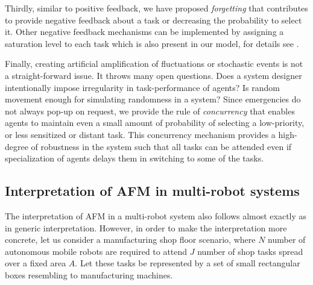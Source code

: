 \documentclass[final,5p,times,twocolumn]{elsarticle}
\begin{document}
Thirdly, similar to positive feedback, we have proposed {\em forgetting} that contributes to provide negative feedback about a task or decreasing the probability to select it. Other negative feedback mechanisms can be implemented by assigning a saturation level to each task which is also present in our model, for details see \citet{Arcaute+2008}.

Finally, creating  artificial amplification of fluctuations or stochastic events is not a straight-forward issue. It throws  many open questions. Does a system designer intentionally impose irregularity in task-performance of agents?  Is random movement  enough for simulating randomness in a system?
Since emergencies do not always pop-up on request, we provide the rule of {\em concurrency} that enables agents to  maintain even a small amount of probability of selecting a low-priority, or less sensitized or distant task. This concurrency mechanism provides a high-degree of robustness in the system such that all tasks can be attended even if specialization of agents delays them in switching to some of the tasks.
\subsection{Interpretation of AFM in multi-robot systems}
\label{afm:mrs-interpretation}
The interpretation of AFM in a multi-robot system also follows almost exactly as in generic interpretation. However, in order to make the interpretation more concrete, let us consider a manufacturing shop floor scenario, where $N$ number of autonomous mobile robots are required to attend $J$ number of shop tasks spread over a fixed area $A$. Let these tasks be represented by a set of small rectangular boxes resembling to manufacturing machines.
\end{document}
